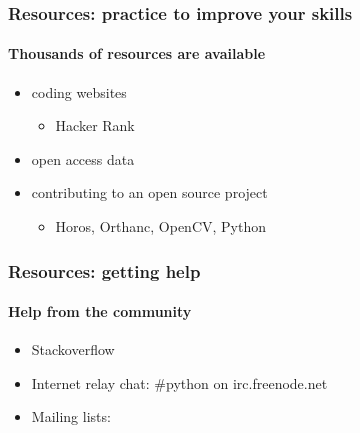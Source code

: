 \documentclass{beamer}
\begin{document}
    \begin{frame}
	    \frametitle{Resources: practice to improve your skills}
	    \framesubtitle{Thousands of resources are available}
	    \begin{itemize}
		    \item coding websites
			    \begin{itemize}
				    \item Hacker Rank
			    \end{itemize}
		    \item open access data
		    \item contributing to an open source project
			    \begin{itemize}
				    \item Horos, Orthanc, OpenCV, Python
			    \end{itemize}
	    \end{itemize}
    \end{frame}

    \begin{frame}
	    \frametitle{Resources: getting help}
	    \framesubtitle{Help from the community}
	    \begin{itemize}
		    \item Stackoverflow
		    \item Internet relay chat: \#python on irc.freenode.net
		    \item Mailing lists:
	    \end{itemize}
    \end{frame}
\end{document}
